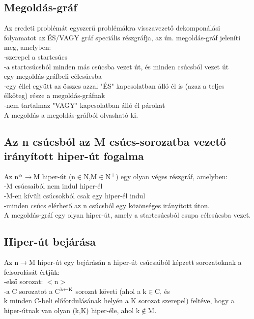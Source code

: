 \documentclass{article}
\begin{document}
	 \subsection{Megoldás-gráf}
	 Az eredeti problémát egyszerű problémákra visszavezető dekomponálási folyamatot az ÉS/VAGY gráf speciális részgráfja, az ún. megoldás-gráf jeleníti meg, amelyben:\\
	 \hspace*{1em} -szerepel a startcsúcs\\
	 \hspace*{1em} -a startcsúcsból minden más csúcsba vezet út, és minden csúcsból vezet út\\
	 \hspace*{1em} egy megoldás-gráfbeli célcsúcsba\\
	 \hspace*{1em} -egy éllel együtt az összes azzal "ÉS" kapcsolatban álló él is (azaz a teljes\\
	 \hspace*{1em} élköteg) része a megoldás-gráfnak\\
	 \hspace*{1em} -nem tartalmaz "VAGY" kapcsolatban álló él párokat\\
	 A megoldás a megoldás-gráfból olvasható ki.
	 
	 \subsection{Az n csúcsból az M csúcs-sorozatba vezető irányított hiper-út fogalma}
	 Az n$\textsuperscript{$\alpha$}$$\rightarrow$M hiper-út (n$\in$N,M$\in$N$\textsuperscript{+}$) egy olyan véges részgráf, amelyben:\\
	 \hspace*{1em}-M csúcsaiból nem indul hiper-él\\
	 \hspace*{1em}-M-en kívüli csúcsokból csak egy hiper-él indul\\
	 \hspace*{1em}-minden csúcs elérhető az n csúcsból egy közönséges irányított úton.\\
	 A megoldás-gráf egy olyan hiper-út, amely a startcsúcsból csupa célcsúcsba vezet.
	 
	 \subsection{Hiper-út bejárása}
	 Az n$\rightarrow$M hiper-út egy bejárásán a hiper-út csúcsaiból képzett sorozatoknak a felsorolását értjük:\\
	 \hspace*{1em} -első sorozat: $<$n$>$\\
	 \hspace*{1em} -a C sorozatot a C$\textsuperscript{k$\leftarrow$K}$ sorozat követi (ahol a k$\in$C, és\\
	 \hspace*{1em} k minden C-beli előfordulásának helyén a K sorozat szerepel) feltéve, hogy a\\
	 \hspace*{1em} hiper-útnak van olyan (k,K) hiper-éle, ahol k$\notin$M.\\
	 
\end{document}

